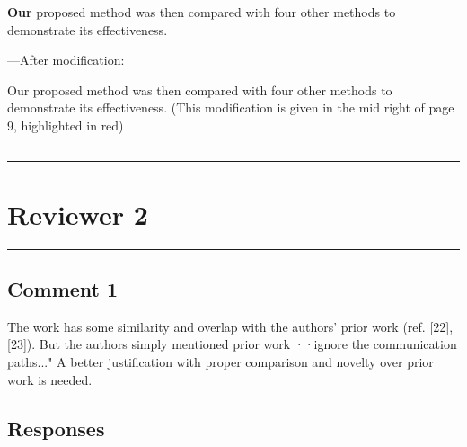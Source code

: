 \documentclass[10pt,journal, compsoc]{IEEEtran}
\begin{document}
\textbf{Our} proposed method was then compared with four other methods to demonstrate its effectiveness.

\vspace{0.5em}
\noindent---After modification:

Our proposed method was then compared with four other methods to demonstrate its effectiveness. (This modification is given in the mid right of page 9, highlighted in red)



\noindent\rule[0.25\baselineskip]{252pt}{1pt}
\noindent\rule[0.25\baselineskip]{252pt}{1pt}





\vspace*{3em}



\section*{{\Large Reviewer 2}}

\noindent\rule[0.25\baselineskip]{252pt}{1pt}

\subsection*{Comment 1}
The work has some similarity and overlap with the authors' prior work (ref. [22], [23]). But the authors simply mentioned prior work ··ignore the communication paths..." A better justification with proper comparison and novelty over prior work is needed.

\subsection*{Responses}
\end{document}
